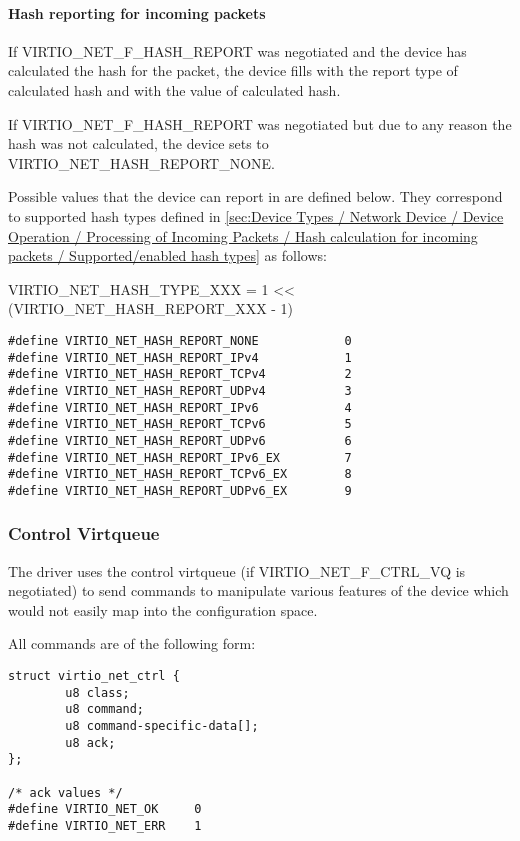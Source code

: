 \paragraph{Hash reporting for incoming packets}
\label{sec:Device Types / Network Device / Device Operation / Processing of Incoming Packets / Hash reporting for incoming packets}

If VIRTIO_NET_F_HASH_REPORT was negotiated and
 the device has calculated the hash for the packet, the device fills  with the report type of calculated hash
and  with the value of calculated hash.

If VIRTIO_NET_F_HASH_REPORT was negotiated but due to any reason the
hash was not calculated, the device sets  to VIRTIO_NET_HASH_REPORT_NONE.

Possible values that the device can report in  are defined below.
They correspond to supported hash types defined in
\ref{sec:Device Types / Network Device / Device Operation / Processing of Incoming Packets / Hash calculation for incoming packets / Supported/enabled hash types}
as follows:

VIRTIO_NET_HASH_TYPE_XXX = 1 << (VIRTIO_NET_HASH_REPORT_XXX - 1)

\begin{lstlisting}
#define VIRTIO_NET_HASH_REPORT_NONE            0
#define VIRTIO_NET_HASH_REPORT_IPv4            1
#define VIRTIO_NET_HASH_REPORT_TCPv4           2
#define VIRTIO_NET_HASH_REPORT_UDPv4           3
#define VIRTIO_NET_HASH_REPORT_IPv6            4
#define VIRTIO_NET_HASH_REPORT_TCPv6           5
#define VIRTIO_NET_HASH_REPORT_UDPv6           6
#define VIRTIO_NET_HASH_REPORT_IPv6_EX         7
#define VIRTIO_NET_HASH_REPORT_TCPv6_EX        8
#define VIRTIO_NET_HASH_REPORT_UDPv6_EX        9
\end{lstlisting}

\subsubsection{Control Virtqueue}\label{sec:Device Types / Network Device / Device Operation / Control Virtqueue}

The driver uses the control virtqueue (if VIRTIO_NET_F_CTRL_VQ is
negotiated) to send commands to manipulate various features of
the device which would not easily map into the configuration
space.

All commands are of the following form:

\begin{lstlisting}
struct virtio_net_ctrl {
        u8 class;
        u8 command;
        u8 command-specific-data[];
        u8 ack;
};

/* ack values */
#define VIRTIO_NET_OK     0
#define VIRTIO_NET_ERR    1
\end{lstlisting}

